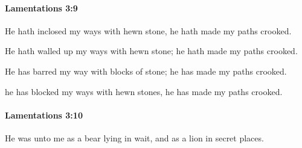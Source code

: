 		\paragraph{Lamentations 3:9} %
			\label{LAMENTATIONS-3-9}

			He hath inclosed my ways with hewn stone, he hath made my paths crooked.

			\begin{versebox}
					\item[BHS] 
					\item[LXX] 
					\item[ASV] He hath walled up my ways with hewn stone; he hath made my paths crooked.
					\item[NIV] He has barred my way with blocks of stone; he has made my paths crooked.
					\item[NRSV] he has blocked my ways with hewn stones, he has made my paths crooked.
			\end{versebox}

		\paragraph{Lamentations 3:10} %
			\label{LAMENTATIONS-3-10}

			He was unto me as a bear lying in wait, and as a lion in secret places.

